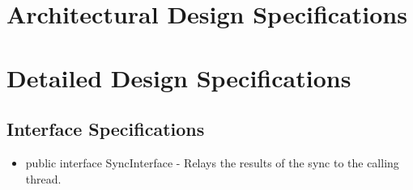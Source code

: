 \documentclass[a4wide]{article}
\begin{document}
\section{Architectural Design Specifications}
\section{Detailed Design Specifications}

\subsection{Interface Specifications}
\begin{itemize}
\item public interface SyncInterface\newline
- Relays the results of the sync to the calling thread.
\end{itemize}
\end{document}

